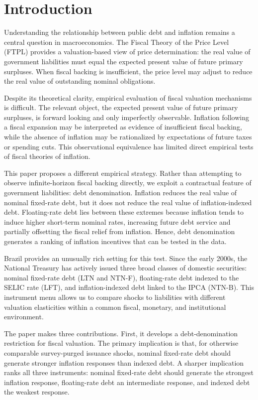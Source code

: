 \documentclass[12pt,a4paper]{article}
\begin{document}
\section{Introduction}

Understanding the relationship between public debt and inflation remains a central question in macroeconomics. The Fiscal Theory of the Price Level (FTPL) provides a valuation-based view of price determination: the real value of government liabilities must equal the expected present value of future primary surpluses. When fiscal backing is insufficient, the price level may adjust to reduce the real value of outstanding nominal obligations.

Despite its theoretical clarity, empirical evaluation of fiscal valuation mechanisms is difficult. The relevant object, the expected present value of future primary surpluses, is forward looking and only imperfectly observable. Inflation following a fiscal expansion may be interpreted as evidence of insufficient fiscal backing, while the absence of inflation may be rationalized by expectations of future taxes or spending cuts. This observational equivalence has limited direct empirical tests of fiscal theories of inflation.

This paper proposes a different empirical strategy. Rather than attempting to observe infinite-horizon fiscal backing directly, we exploit a contractual feature of government liabilities: debt denomination. Inflation reduces the real value of nominal fixed-rate debt, but it does not reduce the real value of inflation-indexed debt. Floating-rate debt lies between these extremes because inflation tends to induce higher short-term nominal rates, increasing future debt service and partially offsetting the fiscal relief from inflation. Hence, debt denomination generates a ranking of inflation incentives that can be tested in the data.

Brazil provides an unusually rich setting for this test. Since the early 2000s, the National Treasury has actively issued three broad classes of domestic securities: nominal fixed-rate debt (LTN and NTN-F), floating-rate debt indexed to the SELIC rate (LFT), and inflation-indexed debt linked to the IPCA (NTN-B). This instrument menu allows us to compare shocks to liabilities with different valuation elasticities within a common fiscal, monetary, and institutional environment.

The paper makes three contributions. First, it develops a debt-denomination restriction for fiscal valuation. The primary implication is that, for otherwise comparable survey-purged issuance shocks, nominal fixed-rate debt should generate stronger inflation responses than indexed debt. A sharper implication ranks all three instruments: nominal fixed-rate debt should generate the strongest inflation response, floating-rate debt an intermediate response, and indexed debt the weakest response.
\end{document}
